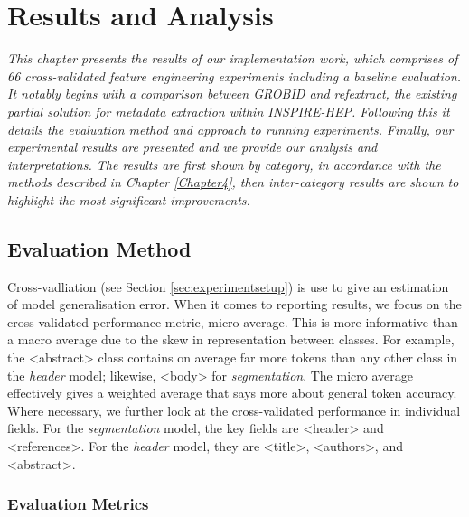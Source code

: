 
\chapter{Results and Analysis} %

\label{Chapter5} %


\emph{This chapter presents the results of our implementation work, which comprises of 66 cross-validated feature engineering experiments including a baseline evaluation. It notably begins with a comparison between GROBID and refextract, the existing partial solution for metadata extraction within INSPIRE-HEP. Following this it details the evaluation method and approach to running experiments. Finally, our experimental results are presented and we provide our analysis and interpretations. The results are first shown by category, in accordance with the methods described in Chapter \ref{Chapter4}, then inter-category results are shown to highlight the most significant improvements.}

\section{Evaluation Method}

Cross-vadliation (see Section \ref{sec:experimentsetup}) is use to give an estimation of model generalisation error. When it comes to reporting results, we focus on the cross-validated performance metric, micro average. This is more informative than a macro average due to the skew in representation between classes. For example, the <abstract> class contains on average far more tokens than any other class in the \emph{header} model; likewise, <body> for \emph{segmentation}. The micro average effectively gives a weighted average that says more about general token accuracy. Where necessary, we further look at the cross-validated performance in individual fields. For the \emph{segmentation} model, the key fields are <header> and <references>. For the \emph{header} model, they are <title>, <authors>, and <abstract>.

\subsection{Evaluation Metrics}
\label{subsec:evaluationmethod}

